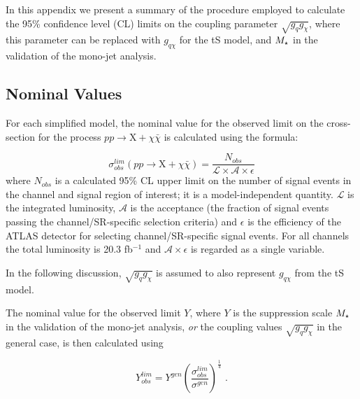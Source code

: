In this appendix we present a summary of the procedure employed to calculate the 95\% confidence level (CL) limits on the coupling parameter $\sqrt{g_{q}g_{\chi}}$, where this parameter can be replaced with $g_{q \chi}$ for the tS model, and $M_{\star}$ in the validation of the mono-jet analysis.

\subsection{Nominal Values}
For each simplified model, the nominal value for the observed limit on the cross-section for the process $pp \rightarrow \mathrm{X} + \chi\bar{\chi}$ is calculated using the formula:

\begin{equation}
\label{sigma_nom}
\sigma_{obs}^{lim}(pp \rightarrow \mathrm{X} + \chi\bar{\chi}) = \frac{N_{obs}}{\mathcal{L}\times\mathcal{A}\times\epsilon}
\end{equation}
where $N_{obs}$ is a calculated 95\% CL upper limit on the number of signal events in the channel and signal region of interest; it is a model-independent quantity. $\mathcal{L}$ is the integrated luminosity, $\mathcal{A}$ is the acceptance (the fraction of signal events passing the channel/SR-specific selection criteria) and $\epsilon$ is the efficiency of the ATLAS detector for selecting channel/SR-specific signal events. For all channels the total luminosity is 20.3 fb$^{-1}$ and $\mathcal{A}\times\epsilon$ is regarded as a single variable.

In the following discussion, $\sqrt{g_q g_{\chi}}$ is assumed to also represent $g_{q \chi}$ from the tS model.

The nominal value for the observed limit $Y$, where $Y$ is the suppression scale $M_{\star}$ in the validation of the mono-jet analysis, \emph{or} the coupling values $\sqrt{g_q g_{\chi}}$ in the general case, is then calculated using


\begin{equation}
\label{nom_lim}
Y_{obs}^{lim} = Y^{gen} \left ( \frac{\sigma_{obs}^{lim}}{\sigma^{gen}} \right)^{\frac{1}{4}} \, \, .
\end{equation}

